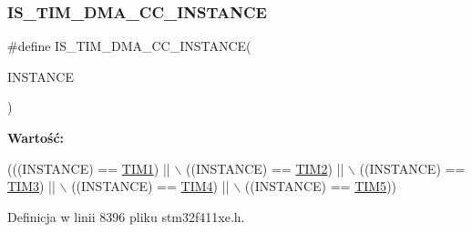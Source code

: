 \mbox{\label{group___exported__macros_gad80a186286ce3daa92249a8d52111aaf}} 
\subsubsection{\texorpdfstring{I\+S\+\_\+\+T\+I\+M\+\_\+\+D\+M\+A\+\_\+\+C\+C\+\_\+\+I\+N\+S\+T\+A\+N\+CE}{IS\_TIM\_DMA\_CC\_INSTANCE}}
{\footnotesize\ttfamily \#define I\+S\+\_\+\+T\+I\+M\+\_\+\+D\+M\+A\+\_\+\+C\+C\+\_\+\+I\+N\+S\+T\+A\+N\+CE(\begin{DoxyParamCaption}\item[{}]{I\+N\+S\+T\+A\+N\+CE }\end{DoxyParamCaption})}

{\bfseries Wartość\+:}
\begin{DoxyCode}
(((INSTANCE) == \hyperlink{group___peripheral__declaration_ga2e87451fea8dc9380056d3cfc5ed81fb}{TIM1}) || \(\backslash\)
                                          ((INSTANCE) == \hyperlink{group___peripheral__declaration_ga3cfac9f2e43673f790f8668d48b4b92b}{TIM2}) || \(\backslash\)
                                          ((INSTANCE) == \hyperlink{group___peripheral__declaration_ga61ee4c391385607d7af432b63905fcc9}{TIM3}) || \(\backslash\)
                                          ((INSTANCE) == \hyperlink{group___peripheral__declaration_ga91a09bad8bdc7a1cb3d85cf49c94c8ec}{TIM4}) || \(\backslash\)
                                          ((INSTANCE) == \hyperlink{group___peripheral__declaration_ga5125ff6a23a2ed66e2e19bd196128c14}{TIM5}))
\end{DoxyCode}


Definicja w linii 8396 pliku stm32f411xe.\+h.

\mbox{\label{group___exported__macros_gad51d77b3bcc12a3a5c308d727b561371}} 
